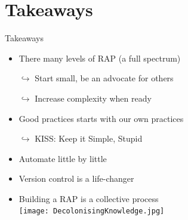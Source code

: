 \documentclass[xcolor=x11names,compress]{beamer}
\renewcommand{\(}{\begin{columns}}
\renewcommand{\)}{\end{columns}}
\newcommand{\<}[1]{\begin{column}{#1}}
\renewcommand{\>}{\end{column}}
\begin{document}
\section{Takeaways}

\begin{frame}{Takeaways }
\pause
\begin{itemize}[<+->]
    \item There many levels of RAP (a full spectrum)
    \item[$\hookrightarrow$] Start small, be an advocate for others
    \item[$\hookrightarrow$] Increase complexity when ready
    \item Good practices starts with our own practices
    \item[$\hookrightarrow$]  KISS: Keep it Simple, Stupid
    \item Automate little by little 
    \item Version control is a life-changer

    \item Building a RAP is a collective process \\
        \texttt{[image: DecolonisingKnowledge.jpg]}
\end{itemize}
\end{frame}
\end{document}
